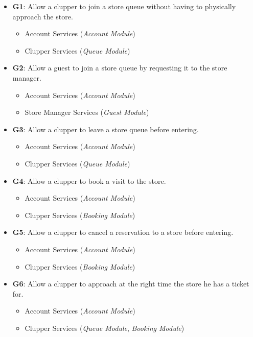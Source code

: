 \begin{itemize}
\item \textbf{G1}: Allow a clupper to join a store queue without having to physically approach the store.
    \begin{itemize}
        \item Account Services (\emph{Account Module})
        \item Clupper Services (\emph{Queue Module})
    \end{itemize}
\item \textbf{G2}: Allow a guest to join a store queue by requesting it to the store manager.
    \begin{itemize}
        \item Account Services (\emph{Account Module})
        \item Store Manager Services (\emph{Guest Module})
    \end{itemize}
\item \textbf{G3}: Allow a clupper to leave a store queue before entering.
    \begin{itemize}
        \item Account Services (\emph{Account Module})
        \item Clupper Services (\emph{Queue Module})
    \end{itemize}
\item \textbf{G4}: Allow a clupper to book a visit to the store.
    \begin{itemize}
        \item Account Services (\emph{Account Module})
        \item Clupper Services (\emph{Booking Module})
    \end{itemize}
\item \textbf{G5}: Allow a clupper to cancel a reservation to a store before entering.
    \begin{itemize}
        \item Account Services (\emph{Account Module})
        \item Clupper Services (\emph{Booking Module})
    \end{itemize}
\item \textbf{G6}: Allow a clupper to approach at the right time the store he has a ticket for.
    \begin{itemize}
        \item Account Services (\emph{Account Module})
        \item Clupper Services (\emph{Queue Module}, \emph{Booking Module})

\end{itemize}
\end{itemize}

